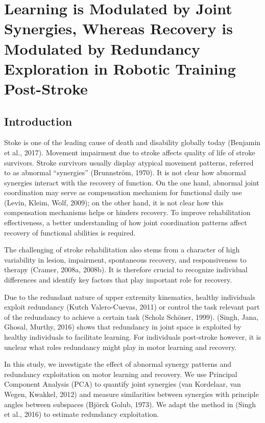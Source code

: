 \chapter{Learning is Modulated by Joint Synergies, Whereas Recovery is Modulated by Redundancy Exploration in Robotic Training Post-Stroke}
\label{cha:armeospring}


\section{Introduction}
Stoke is one of the leading cause of death and disability globally today (Benjamin et al., 2017).
Movement impairment due to stroke affects quality of life of stroke survivors. 
Stroke survivors usually display atypical movement patterns, referred to as abnormal “synergies” (Brunnström, 1970). 
It is not clear how abnormal synergies interact with the recovery of function. 
On the one hand, abnormal joint coordination may serve as compensation mechanism for functional daily use (Levin, Kleim,  Wolf, 2009); 
on the other hand, it is not clear how this compensation mechanisms helps or hinders recovery. 
To improve rehabilitation effectiveness, a better understanding of how joint coordination patterns affect recovery of functional abilities is required.
 
The challenging of stroke rehabilitation also stems from a character of high variability in lesion, impairment, spontaneous recovery, and responsiveness to therapy (Cramer, 2008a, 2008b). 
It is therefore crucial to recognize individual differences and identify key factors that play important role for recovery.
 
Due to the redundant nature of upper extremity kinematics, healthy individuals exploit redundancy (Kutch  Valero-Cuevas, 2011) or control the task relevant part of the redundancy to achieve a certain task (Scholz  Schöner, 1999). 
(Singh, Jana, Ghosal,  Murthy, 2016) shows that redundancy in joint space is exploited by healthy individuals to facilitate learning. 
For individuals post-stroke however, it is unclear what roles redundancy might play in motor learning and recovery.
 
In this study, we investigate the effect of abnormal synergy patterns and redundancy exploitation on motor learning and recovery. 
We use Principal Component Analysis (PCA) to quantify joint synergies (van Kordelaar, van Wegen,  Kwakkel, 2012) and measure similarities between synergies with principle angles between subspaces (Björck  Golub, 1973). 
We adapt the method in (Singh et al., 2016) to estimate redundancy exploitation.
 

